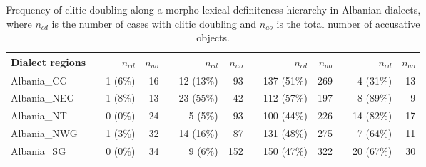 \documentclass[output=paper]{langsci/langscibook}
\begin{document}
\begin{sidewaystable}
\caption{Frequency of clitic doubling along a morpho-lexical definiteness hierarchy in Albanian dialects, where $n_{cd}$ is the number of cases with clitic doubling and $n_{ao}$ is the total number of accusative objects. \label{tab:matoshi:8}}
\begin{tabular}{lcrrcrrcrrcrr}
\lsptoprule
Dialect regions &                    & $n_{cd}$ & $n_{ao}$ &                    & $n_{cd}$ & $n_{ao}$ &                    & $n_{cd}$ & $n_{ao}$ &                    & $n_{cd}$ & $n_{ao}$ \\
\midrule
Albania\_CG     & \parbox[t]{2mm}{} & 1 (6\%)                  & 16                                 & \parbox[t]{2mm}{} & 12 (13\%)                & 93                                 & \parbox[t]{2mm}{} & 137 (51\%)               & 269                                & \parbox[t]{2mm}{} & 4 (31\%)                 & 13                                 \\
Albania\_NEG    &                    & 1 (8\%)                  & 13                                 &                    & 23 (55\%)                & 42                                 &                    & 112 (57\%)               & 197                                &                    & 8 (89\%)                 & 9                                  \\
Albania\_NT     &                    & 0 (0\%)                  & 24                                 &                    & 5 (5\%)                  & 93                                 &                    & 100 (44\%)               & 226                                &                    & 14 (82\%)                & 17                                 \\
Albania\_NWG    &                    & 1 (3\%)                  & 32                                 &                    & 14 (16\%)                & 87                                 &                    & 131 (48\%)               & 275                                &                    & 7 (64\%)                 & 11                                 \\
Albania\_SG     &                    & 0 (0\%)                  & 34                                 &                    & 9 (6\%)                  & 152                                &                    & 150 (47\%)               & 322                                &                    & 20 (67\%)                & 30                                 \\

\end{tabular}
\end{sidewaystable}
\end{document}
